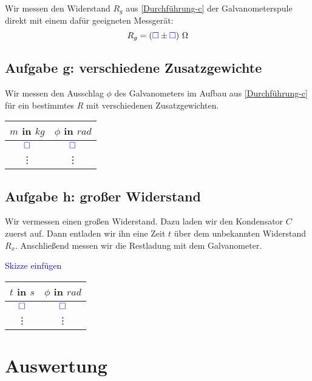 \documentclass[11pt, ngerman]{article}
\newcommand{\emesswert}{\left(\messwert \pm \messwert \right)}
\newcommand{\messwert}{\textcolor{blue}{\square}}
\begin{document}
Wir messen den Widerstand $R_g$ aus \ref{Durchführung-c} der Galvanometerspule
direkt mit einem dafür geeigneten Messgerät:
\[ R_g = \unit[\emesswert] \Omega \]

\subsection{Aufgabe g: verschiedene Zusatzgewichte}

Wir messen den Ausschlag $\phi$ des Galvanometers im Aufbau aus
\ref{Durchführung-c} für ein bestimmtes $R$ mit verschiedenen Zusatzgewichten.

\begin{table}[h!]
	\centering

	\begin{tabular}{cc}
		$m$ in $\unit{kg}$ & $\phi$ in $\unit{rad}$ \\
		\hline
		$\messwert$ & $\messwert$ \\
		\vdots & \vdots
	\end{tabular}
\end{table}

\subsection{Aufgabe h: großer Widerstand}

Wir vermessen einen großen Widerstand. Dazu laden wir den Kondensator $C$
zuerst auf. Dann entladen wir ihn eine Zeit $t$ über dem unbekannten Widerstand
$R_x$. Anschließend messen wir die Restladung mit dem Galvanometer.

\textcolor{blue}{Skizze einfügen}

\begin{table}[h!]
	\centering

	\begin{tabular}{cc}
		$t$ in $\unit{s}$ & $\phi$ in $\unit{rad}$ \\
		\hline
		$\messwert$ & $\messwert$ \\
		\vdots & \vdots
	\end{tabular}
\end{table}


\section{Auswertung}
\end{document}
